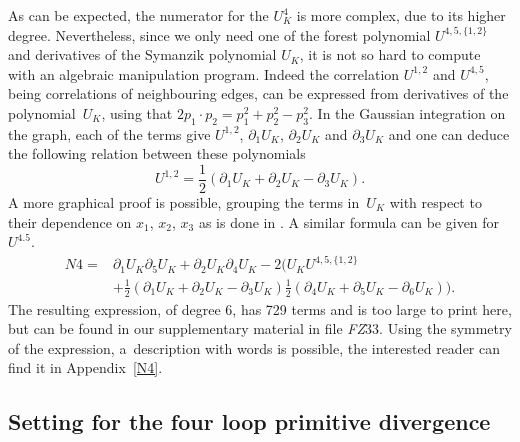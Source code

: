 \documentclass[pdftex]{sigma}
\numberwithin{equation}{section}
\begin{document}
As can be expected, the numerator for the $U_K^4$ is more complex, due to its higher degree. Nevertheless, since we
only need one of the forest polynomial $U^{4,5,\{1,2\}}$ and derivatives of the Symanzik polynomial $U_K$, it is not
so hard to compute with an algebraic manipulation program. Indeed the correlation $U^{1,2}$ and $U^{4,5}$, being correlations of neighbouring
edges, can be expressed from derivatives of the polynomial~$U_K$, using that $2 p_1\cdot p_2 = p_1^2 + p_2^2 - p_3^2$. In the Gaussian
integration on the graph, each of the terms give $U^{1,2}$, $\partial_1 U_K$, $\partial_2 U_K$ and $\partial_3 U_K$ and one can deduce the
following relation between these polynomials
\[
	U^{1,2} = \frac12 (\partial_1 U_K + \partial_2 U_K - \partial_3 U_K).
\]
A more graphical proof is possible, grouping the terms
in~$U_K$ with respect to their dependence on $x_1$, $x_2$, $x_3$ as is done in \cite[Lemma~22]{BrSc10}. A similar formula can be given
for~$U^{4.5}$.
\begin{align*}
	N4 ={}& \partial_1 U_K \partial_5 U_K + \partial_2 U_K \partial_4 U_K - 2\bigl(U_K U^{4,5,\{1,2\}}
	\nonumber\\
		& + \frac12 ( \partial_1 U_K + \partial_2 U_K - \partial_3 U_K )
		\frac12 ( \partial_4 U_K + \partial_5 U_K - \partial_6 U_K ) \biggr).
\end{align*}
The resulting expression, of degree 6, has 729 terms and is too large to print here, but can be found in our supplementary
material in file \emph{FZ$33$}. Using the symmetry of the expression, a~description with words is possible, the interested reader can
find it in Appendix~\ref{N4}.

\subsection{Setting for the four loop primitive divergence}\label{section6.3}
\end{document}
